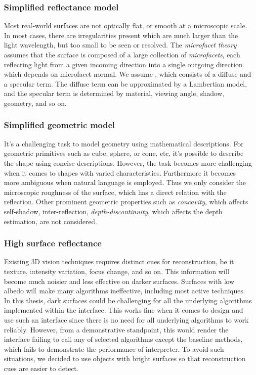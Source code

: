\subsubsection{Simplified reflectance model}
Most real-world surfaces are not optically flat, or smooth at a microscopic scale. In most cases, there are irregularities present which are much larger than the light wavelength, but too small to be seen or resolved. The \textit{microfacet theory} assumes that the surface is composed of a large collection of \textit{microfacets}, each reflecting light from a given incoming direction into a single outgoing direction which depends on microfacet normal. We assume , which consists of a diffuse and a specular term. The diffuse term can be approximated by a Lambertian model, and the specular term is determined by material, viewing angle, shadow, geometry, and so on.

\subsubsection{Simplified geometric model}
It's a challenging task to model geometry using mathematical descriptions. For geometric primitives such as cube, sphere, or cone, etc, it's possible to describe the shape using concise descriptions. However, the task becomes more challenging when it comes to shapes with varied characteristics. Furthermore it becomes more ambiguous when natural language is employed. Thus we only consider the microscopic roughness of the surface, which has a direct relation with the reflection. Other prominent geometric properties such as \textit{concavity}, which affects self-shadow, inter-reflection, \textit{depth-discontinuity}, which affects the depth estimation, are not considered.

\subsubsection{High surface reflectance}
Existing 3D vision techniques requires distinct cues for reconstruction, be it texture, intensity variation, focus change, and so on. This information will become much noisier and less effective on darker surfaces. Surfaces with low albedo will make many algorithms ineffective, including most active techniques. In this thesis, dark surfaces could be challenging for all the underlying algorithms implemented within the interface. This works fine when it comes to design and use such an interface since there is no need for all underlying algorithms to work reliably. However, from a demonstrative standpoint, this would render the interface failing to call any of selected algorithms except the baseline methods, which fails to demonstrate the performance of interpreter. To avoid such situations, we decided to use objects with bright surfaces so that reconstruction cues are easier to detect.

